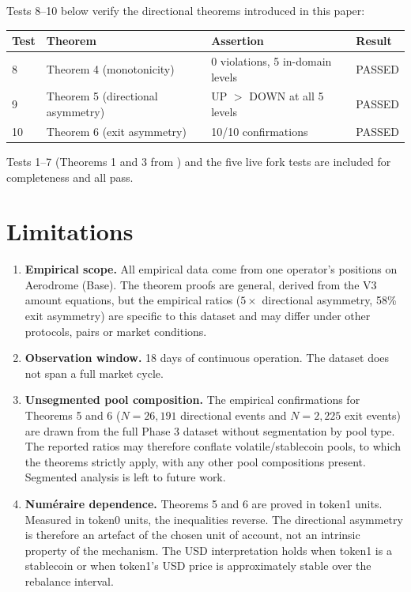 \documentclass[11pt,a4paper]{article}
\theoremstyle{definition}
\begin{document}
Tests 8--10 below verify the directional theorems introduced in this paper:

\begin{table}[H]
\centering
\begin{tabular}{@{}llll@{}}
\toprule
Test & Theorem & Assertion & Result \\
\midrule
8  & Theorem 4 (monotonicity)          & 0 violations, 5 in-domain levels & PASSED \\
9  & Theorem 5 (directional asymmetry) & UP $>$ DOWN at all 5 levels  & PASSED \\
10 & Theorem 6 (exit asymmetry)        & 10/10 confirmations          & PASSED \\
\bottomrule
\end{tabular}
\end{table}

\noindent Tests 1--7 (Theorems 1 and 3 from \citet{ryan2026a}) and the five live fork tests are included for completeness and all pass.

\section{Limitations}\label{sec:limitations}

\begin{enumerate}
    \item \textbf{Empirical scope.} All empirical data come from one operator's positions on Aerodrome (Base). The theorem proofs are general, derived from the V3 amount equations, but the empirical ratios ($5\times$ directional asymmetry, 58\% exit asymmetry) are specific to this dataset and may differ under other protocols, pairs or market conditions.

    \item \textbf{Observation window.} 18 days of continuous operation. The dataset does not span a full market cycle.

    \item \textbf{Unsegmented pool composition.} The empirical confirmations for Theorems 5 and 6 ($N = 26{,}191$ directional events and $N = 2{,}225$ exit events) are drawn from the full Phase 3 dataset without segmentation by pool type. The reported ratios may therefore conflate volatile/stablecoin pools, to which the theorems strictly apply, with any other pool compositions present. Segmented analysis is left to future work.

    \item \textbf{Numéraire dependence.} Theorems 5 and 6 are proved in token1 units. Measured in token0 units, the inequalities reverse. The directional asymmetry is therefore an artefact of the chosen unit of account, not an intrinsic property of the mechanism. The USD interpretation holds when token1 is a stablecoin or when token1's USD price is approximately stable over the rebalance interval.
\end{enumerate}
\end{document}
